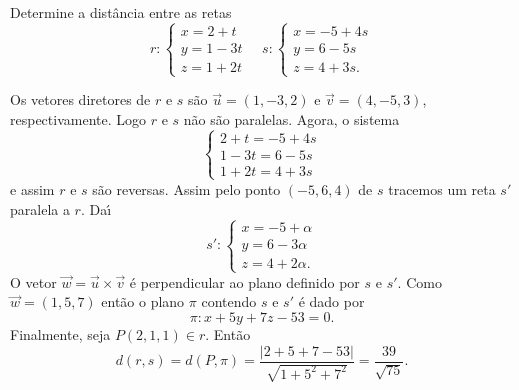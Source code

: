 \begin{exemplo}
    Determine a dist\^ancia entre as retas
    \[
        r: \begin{cases}
            x = 2 + t\\
            y = 1 - 3t\\
            z = 1 + 2t
        \end{cases} \quad s: \begin{cases}
            x = -5 + 4s\\
            y = 6 - 5s\\
            z = 4 + 3s.
        \end{cases}
    \]
    \begin{solucao}
        Os vetores diretores de $r$ e $s$ s\~ao $\vec{u} = (1,-3,2)$ e $\vec{v} = (4,-5,3)$, respectivamente. Logo $r$ e $s$ n\~ao s\~ao paralelas. Agora, o sistema
        \[
            \begin{cases}
                2 + t = -5 + 4s\\
                1 - 3t = 6 - 5s\\
                1 + 2t = 4 + 3s
            \end{cases}
        \]
        e assim $r$ e $s$ s\~ao reversas. Assim pelo ponto $(-5,6,4)$ de $s$ tracemos um reta $s'$ paralela a $r$. Da{\'\i}
        \[
            s' : \begin{cases}
                x = -5 + \alpha\\
                y = 6 - 3\alpha\\
                z = 4 + 2\alpha.
            \end{cases}
        \]
        O vetor $\vec{w} = \vec{u}\times\vec{v}$ \'e perpendicular ao plano definido por $s$ e $s'$. Como $\vec{w} = (1,5,7)$ ent\~ao o plano $\pi$ contendo $s$ e $s'$ \'e dado por
        \[
            \pi : x + 5y + 7z - 53 = 0.
        \]
        Finalmente, seja $P(2,1,1) \in r$. Ent\~ao
        \[
            d(r,s) = d(P,\pi) = \dfrac{|2 + 5 + 7 - 53|}{\sqrt{1 + 5^2 + 7^2}} = \dfrac{39}{\sqrt{75}}.
        \]


    \end{solucao}
\end{exemplo}

